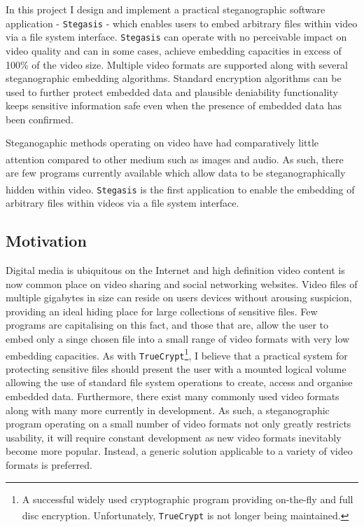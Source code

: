 \documentclass[paper=a4, fontsize=11pt,twoside]{scrartcl}
\numberwithin{table}{section}
\numberwithin{figure}{section}
\numberwithin{algorithm}{section}
\begin{document}
In this project I design and implement a practical steganographic software application - \texttt{Stegasis} - which enables users to embed arbitrary files within video via a file system interface. \texttt{Stegasis} can operate with no perceivable impact on video quality and can in some cases, achieve embedding capacities in excess of 100\% of the video size. Multiple video formats are supported along with several steganographic embedding algorithms. Standard encryption algorithms can be used to further protect embedded data and plausible deniability functionality keeps sensitive information safe even when the presence of embedded data has been confirmed.

Steganogaphic methods operating on video have had comparatively little attention compared to other medium such as images and audio\textsuperscript{\cite{digmedia2}}. As such, there are few programs currently available which allow data to be steganographically hidden within video\textsuperscript{\cite{survey}}. \texttt{Stegasis} is the first application to enable the embedding of arbitrary files within videos via a file system interface.   

\subsection{Motivation}
Digital media is ubiquitous on the Internet and high definition video content is now common place on video sharing and social networking websites. Video files of multiple gigabytes in size can reside on users devices without arousing suspicion, providing an ideal hiding place for large collections of sensitive files. Few programs are capitalising on this fact, and those that are, allow the user to embed only a singe chosen file into a small range of video formats with very low embedding capacities. As with \texttt{TrueCrypt}\footnote{A successful widely used cryptographic program providing on-the-fly and full disc encryption\textsuperscript{\cite{truecrypt}}. Unfortunately, \texttt{TrueCrypt} is not longer being maintained.}, I believe that a practical system for protecting sensitive files should present the user with a mounted logical volume allowing the use of standard file system operations to create, access and organise embedded data. Furthermore, there exist many commonly used video formats along with many more currently in development. As such, a steganographic program operating on a small number of video formats not only greatly restricts usability, it will require constant development as new video formats inevitably become more popular. Instead, a generic solution applicable to a variety of video formats is preferred.
\end{document}
